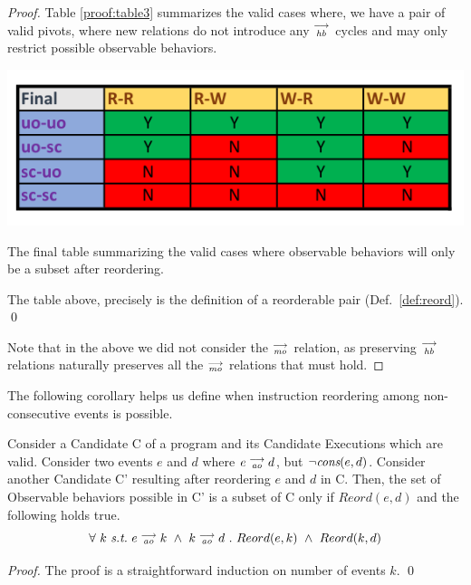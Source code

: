 \begin{proof}
        Table \ref{proof:table3} summarizes the valid cases where, we have a pair of valid pivots, where new relations do not introduce any $\stackrel{\longrightarrow}{_\textit{hb}}$ cycles and may only restrict possible observable behaviors. 
        \begin{table}[H]
            \centering
            \includegraphics[scale=0.7]{Table4_Final.pdf}
            \caption{The final table summarizing the valid cases where observable behaviors will only be a subset after reordering.}
            \label{proof:table3}
        \end{table}
    
        The table above, precisely is the definition of a reorderable pair (Def.~\ref{def:reord}). \qed
                
        \vspace{1mm}Note that in the above we did not consider the $\stackrel{\longrightarrow}{_\textit{mo}}$ relation, as preserving $\stackrel{\longrightarrow}{_\textit{hb}}$ relations naturally preserves all the $\stackrel{\longrightarrow}{_\textit{mo}}$ relations that must hold.
\end{proof}

    The following corollary helps us define when instruction reordering among non-consecutive events is possible.
  

\begin{corollary}
    Consider a Candidate C of a program and its Candidate Executions which are valid. Consider two events $e$ and $d$ where $e\stackrel{\longrightarrow}{_{\textit{ao}}}d$, but $\neg \textit{cons}(e,d)$. Consider another Candidate C' resulting after reordering $e$ and $d$ in C. Then, the set of Observable behaviors possible in C' is a subset of C only if $Reord(e,d)$ and the following holds true.
    \[
        \forall \ k \ \textit{s.t.} \ 
        \reln{e}{ao}{k} \ \wedge \ \reln{k}{ao}{d} \ . \ 
        Reord(e,k) \ \wedge \ Reord(k,d)
    \]
    
\end{corollary}
    
\begin{proof}
    The proof is a straightforward induction on number of events $k$. 
    \qed
\end{proof}